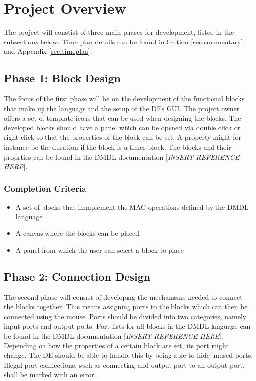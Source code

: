 \documentclass[12pt,twoside]{article}
\begin{document}
\section{Project Overview}
\label{sec:overview}

The project will constist of three main phases for development, listed in the subsections below. Time
plan details can be found in Section \ref{sec:commentary} and Appendix \ref{sec:timeplan}.

\subsection{Phase 1: Block Design}
The focus of the first phase will be on the development of the functional blocks that make up the language
and the setup of the DEs GUI. The project owner offers a set of template icons that can be used when
designing the blocks. The developed blocks should have a panel which can be opened via double click or right click
so that the properties of the block can be set. A property might for instance be the duration if the block is a timer block.
The blocks and their proprties can be found in the DMDL documentation [\textit{INSERT REFERENCE HERE}].
\subsubsection{Completion Criteria}
\begin{itemize}[label={\checkmark}]
\item A set of blocks that immplement the MAC operations defined by the DMDL language
\item A canvas where the blocks can be placed
\item A panel from which the user can select a block to place
\end{itemize}

\subsection{Phase 2: Connection Design}
The second phase will consist of developing the mechanisms needed to connect
the blocks together. This means assigning ports to the blocks which can then be connected using the mouse.
Ports should be divided into two categories, namely input ports and output ports. Port lists for all blocks
in the DMDL language can be found in the DMDL documentation [\textit{INSERT REFERENCE HERE}].
Depending on how the properties of a certain block are set, its port might change. The DE should
be able to handle this by being able to hide unused ports. Illegal port connections, such as connecting
and output port to an output port, shall be marked with an error.
\end{document}

